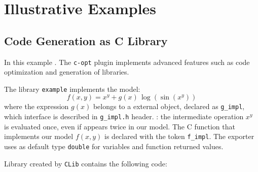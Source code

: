 
\section{Illustrative Examples}
\label{sec:examples}

\subsection{Code Generation as C Library}
In this example . The \texttt{c-opt} plugin implements advanced features such as code optimization and generation of libraries.

The library \texttt{example} implements the model:
\begin{equation}
f(x, y) = x^y + g(x)\, \log(\sin(x^y))
\end{equation}
where the expression $g(x)$ belongs to a external object, declared as \texttt{g\_impl}, which interface is described in \texttt{g\_impl.h} header. : the intermediate operation $x^y$ is evaluated once, even if appears twice in our model. The C function that implements our model $f(x,y)$ is declared with the token \texttt{f\_impl}. The exporter uses as default type \texttt{double} for variables and function returned values.

\noindent%


Library created by \texttt{CLib} contains the following code:

\noindent%
\begin{minipage}{.5\textwidth}

\end{minipage}\hfill
\begin{minipage}{.5\textwidth}

\end{minipage}

